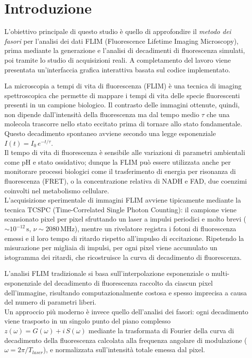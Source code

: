 \chapter{Introduzione}\label{sec:introduzione}

\noindent L'obiettivo principale di questo studio è quello di approfondire il \textit{metodo dei fasori} per l'analisi dei dati FLIM (Fluorescence Lifetime Imaging Microscopy), prima mediante la generazione e l'analisi di decadimenti di fluorescenza simulati, poi tramite lo studio di acquisizioni reali. A completamento del lavoro viene presentata un'interfaccia grafica interattiva basata sul codice implementato.

La microscopia a tempi di vita di fluorescenza (FLIM) è una tecnica di imaging spettroscopica che permette di mappare i tempi di vita delle specie fluorescenti presenti in un campione biologico. Il contrasto delle immagini ottenute, quindi, non dipende dall'intensità della fluorescenza ma dal tempo medio $\tau$ che una molecola trascorre nello stato eccitato prima di tornare allo stato fondamentale. Questo decadimento spontaneo avviene secondo una legge esponenziale $I(t)=I_0\,e^{-t/\tau}$.\\
Il tempo di vita di fluorescenza è sensibile alle variazioni di parametri ambientali come pH e stato ossidativo; dunque la FLIM può essere utilizzata anche per monitorare processi biologici come il trasferimento di energia per risonanza di fluorescenza (FRET), o la concentrazione relativa di NADH e FAD, due coenzimi coinvolti nel metabolismo cellulare.\\ 
L'acquisizione sperimentale di immagini FLIM avviene tipicamente mediante la tecnica TCSPC (Time-Correlated Single Photon Counting): il campione viene scansionato pixel per pixel sfruttando un laser a impulsi periodici e molto brevi ($\sim10^{-12}\,\text{s}$, $\nu \sim 2080\,\text{MHz}$), mentre un rivelatore registra i fotoni di fluorescenza emessi e il loro tempo di ritardo rispetto all'impulso di eccitazione.
Ripetendo la misurazione per migliaia di impulsi, per ogni pixel viene accumulato un istogramma dei ritardi, che ricostruisce la curva di decadimento di fluorescenza.

L'analisi FLIM tradizionale si basa sull'interpolazione esponenziale o multi-esponenziale del decadimento di fluorescenza raccolto da ciascun pixel dell'immagine, risultando computazionalmente costosa e spesso imprecisa a causa del numero di parametri liberi.\\
Un approccio più moderno è invece quello dell'analisi dei fasori: ogni decadimento viene trasposto in un singolo punto del piano complesso $z(\omega) = G(\omega) + i\,S(\omega)$ mediante la trasformata di Fourier della curva di decadimento della fluorescenza calcolata alla frequenza angolare di modulazione ($\omega =2\pi/T_{laser}$), e normalizzata sull'intensità totale emessa dal pixel.

